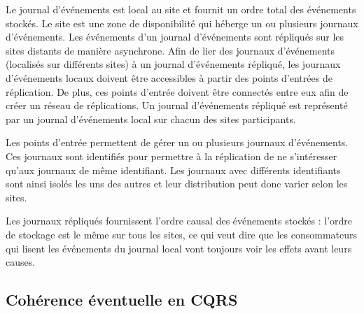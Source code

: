 Le journal d'événements est local au site et fournit un ordre total des 
événements stockés. 
Le site est une zone de disponibilité qui héberge un ou plusieurs 
journaux d'événements. Les événements d'un journal d'événements sont 
répliqués sur les sites distants de manière asynchrone. 
Afin de lier des journaux d'événements (localisés sur différents sites) à un journal 
d'événements répliqué, les 
journaux d'événements locaux doivent être accessibles à partir des points 
d'entrées de réplication. De plus, ces points d'entrée doivent être 
connectés entre eux afin de créer un réseau de réplications. 
Un journal d'événements répliqué est représenté par un journal d'événements local 
sur chacun des sites participants.

Les points d'entrée permettent de gérer un ou plusieurs journaux d'événements. 
Ces journaux sont identifiés pour permettre à la réplication de ne s'intéresser 
qu'aux journaux de même identifiant. 
Les journaux avec différents identifiants sont ainsi isolés les uns des autres et 
leur distribution peut donc varier selon les sites.

Les journaux répliqués fournissent l'ordre causal des événements stockés : l'ordre 
de stockage est le même sur tous les sites, ce qui veut dire que les 
consommateurs qui lisent les événements du journal local vont toujours voir les 
effets avant leurs causes.



\subsection{Cohérence éventuelle en CQRS}



